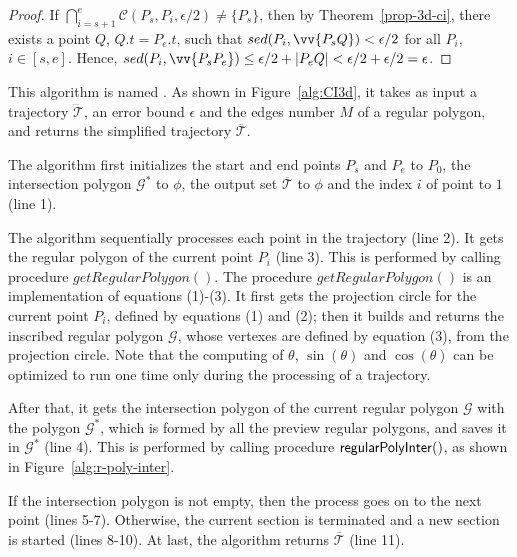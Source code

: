 \begin{proof}
If $\bigcap_{i=s+1}^{e}{\mathcal{C}(P_s, P_i, \epsilon/2)} \ne \{P_s\}$, then by Theorem~\ref{prop-3d-ci}, there exists a point $Q$, $Q.t = P_e.t$, such that $sed(P_i, \vv{P_sQ})<\epsilon/2$ for all $P_i$, $i \in [s,e]$. Hence, $sed(P_i, \vv{P_sP_e})\le \epsilon/2 + |P_eQ| < \epsilon/2 + \epsilon/2 = \epsilon$.
\end{proof}



This algorithm is named \cist. As shown in Figure~\ref{alg:CI3d}, it takes as input a trajectory $\dddot{\mathcal{T}}$, an error bound $\epsilon$ and the edges number $M$ of a regular polygon, and returns the simplified trajectory $\overline{\mathcal{T}}$.

The algorithm first initializes the start and end points $P_s$ and $P_e$ to $P_0$, the intersection polygon $\mathcal{G}^*$ to $\phi$, the output set $\overline{\mathcal{T}}$ to $\phi$ and the index $i$ of point to $1$ (line 1).

The algorithm sequentially processes each point in the trajectory (line 2).
It gets the regular polygon of the current point $P_i$ (line 3).
This is performed by calling procedure $getRegularPolygon()$. The procedure $getRegularPolygon()$ is an implementation of equations (1)-(3). It first gets the projection circle for the current point $P_i$, defined by equations (1) and (2); then it builds and returns the inscribed regular polygon $\mathcal{G}$, whose vertexes are defined by equation (3), from the projection circle.
Note that the computing of $\theta$, $\sin(\theta)$ and $\cos(\theta)$ can be optimized to run one time only during the processing of a trajectory.

After that, it gets the intersection polygon of the current regular polygon $\mathcal{G}$ with the polygon $\mathcal{G}^*$, which is formed by all the preview regular polygons, and saves it in $\mathcal{G}^*$ (line 4).
This is performed by calling procedure ${\mathsf{regularPolyInter}}()$, as shown in Figure~\ref{alg:r-poly-inter}.

If the intersection polygon is not empty, then the process goes on to the next point (lines 5-7).
Otherwise, the current section is terminated and a new section is started (lines 8-10).
%
At last, the algorithm returns $\overline{\mathcal{T}}$ (line 11).


